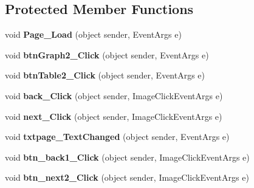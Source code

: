 \subsection*{Protected Member Functions}
\begin{DoxyCompactItemize}
\item 
\hypertarget{classusertrackmyhealth__sleep_a3aabc509095a8e0bb6079f39c596ad5a}{void {\bfseries Page\-\_\-\-Load} (object sender, Event\-Args e)}\label{classusertrackmyhealth__sleep_a3aabc509095a8e0bb6079f39c596ad5a}

\item 
\hypertarget{classusertrackmyhealth__sleep_a0e86e0abae54854a4077b096efb18469}{void {\bfseries btn\-Graph2\-\_\-\-Click} (object sender, Event\-Args e)}\label{classusertrackmyhealth__sleep_a0e86e0abae54854a4077b096efb18469}

\item 
\hypertarget{classusertrackmyhealth__sleep_a3388aeaa657b9eb07af576d7501dac72}{void {\bfseries btn\-Table2\-\_\-\-Click} (object sender, Event\-Args e)}\label{classusertrackmyhealth__sleep_a3388aeaa657b9eb07af576d7501dac72}

\item 
\hypertarget{classusertrackmyhealth__sleep_afcbe876c232d3ee9cceb946750a0bf13}{void {\bfseries back\-\_\-\-Click} (object sender, Image\-Click\-Event\-Args e)}\label{classusertrackmyhealth__sleep_afcbe876c232d3ee9cceb946750a0bf13}

\item 
\hypertarget{classusertrackmyhealth__sleep_a6a41711c27be111c320c4a744bd17649}{void {\bfseries next\-\_\-\-Click} (object sender, Image\-Click\-Event\-Args e)}\label{classusertrackmyhealth__sleep_a6a41711c27be111c320c4a744bd17649}

\item 
\hypertarget{classusertrackmyhealth__sleep_aa4c2e4e9c2b3ef991234d6a79caca5ed}{void {\bfseries txtpage\-\_\-\-Text\-Changed} (object sender, Event\-Args e)}\label{classusertrackmyhealth__sleep_aa4c2e4e9c2b3ef991234d6a79caca5ed}

\item 
\hypertarget{classusertrackmyhealth__sleep_a2525265a564d4d25295fbe840459d724}{void {\bfseries btn\-\_\-back1\-\_\-\-Click} (object sender, Image\-Click\-Event\-Args e)}\label{classusertrackmyhealth__sleep_a2525265a564d4d25295fbe840459d724}

\item 
\hypertarget{classusertrackmyhealth__sleep_a268e120a124689e8052ce36dbf5a09bd}{void {\bfseries btn\-\_\-next2\-\_\-\-Click} (object sender, Image\-Click\-Event\-Args e)}\label{classusertrackmyhealth__sleep_a268e120a124689e8052ce36dbf5a09bd}


\end{DoxyCompactItemize}
